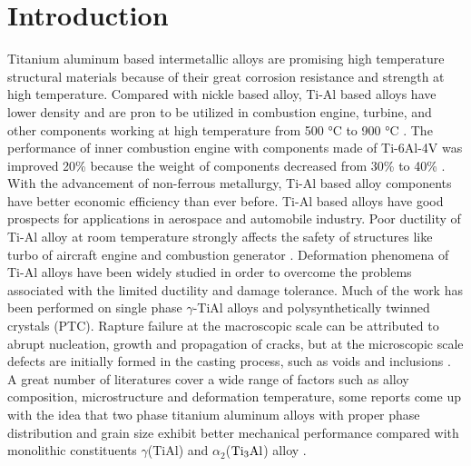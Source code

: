 \documentclass[Unknown,article,submit,moreauthors,pdftex,10pt,a4paper]{Definitions/mdpi}
\begin{document}
\section{Introduction}
Titanium aluminum based intermetallic alloys are promising high temperature structural materials because of their great corrosion resistance and strength at high temperature. Compared with nickle based alloy, Ti-Al based alloys have lower density and are pron to be utilized in combustion engine, turbine, and other components working at high temperature from 500 \si{\degreeCelsius} to 900 \si{\degreeCelsius} \cite{Clemens2016}. The performance of inner combustion engine with components made of Ti-6Al-4V was improved 20\% because the weight of components decreased from 30\% to 40\% \cite{Bewlay2016}. With the advancement of non-ferrous metallurgy, Ti-Al based alloy components have better economic efficiency than ever before. Ti-Al based alloys have good prospects for applications in aerospace and automobile industry. 
Poor ductility of Ti-Al alloy at room temperature strongly affects the safety of structures like turbo of aircraft engine and combustion generator \cite{Munz2017}. Deformation phenomena of Ti-Al alloys have been widely studied in order to overcome the problems associated with the limited ductility and damage tolerance.  Much of the work has been performed on single phase $\gamma$-TiAl alloys and polysynthetically twinned crystals (PTC)\cite{Appel2016}. Rapture failure at the macroscopic scale can be attributed to abrupt nucleation, growth and propagation of cracks, but at the microscopic scale defects are initially formed in the casting process, such as voids and inclusions \cite{Tang2014}. A great number of literatures cover a wide range of factors such as alloy composition, microstructure and deformation temperature, some reports come up with the idea that two phase titanium aluminum alloys with proper phase distribution and grain size exhibit better mechanical performance compared with monolithic constituents $\gamma$(TiAl) and $\alpha_2$($\rm Ti_3Al$) alloy \cite{Kim1995}. 
\end{document}

